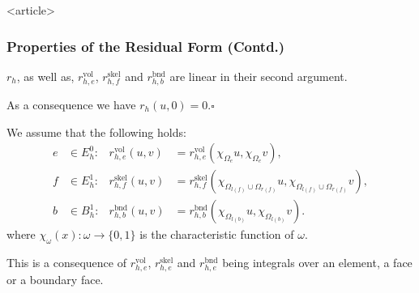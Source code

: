 \begin{frame}<article>
\frametitle<presentation>{Properties of the Residual Form (Contd.)}
\begin{Pro}[Linearity]\label{Ass:Linearity}
$r_h$, as well as, $r^\text{vol}_{h,e}$, $r^\text{skel}_{h,f}$ and
$r^\text{bnd}_{h,b}$ are linear in their second
argument.

As a consequence we have $r_h(u,0)=0$.\hfill$\square$
\end{Pro}
\begin{Pro}[Localization]
We assume that the following holds:
\begin{subequations}
\begin{align*}
e&\in E^0_h : & r^\text{vol}_{h,e}(u,v) &= r^\text{vol}_{h,e}(\chi_{\Omega_e} u,\chi_{\Omega_e} v),\\
f&\in E^1_h : & r^\text{skel}_{h,f}(u,v) &=
r^\text{skel}_{h,f}(\chi_{\Omega_{l(f)}\cup\Omega_{r(f)}}
u,\chi_{\Omega_{l(f)}\cup\Omega_{r(f)}} v),\\ 
b&\in B^1_h : & r^\text{bnd}_{h,b}(u,v) &= r^\text{bnd}_{h,b}(\chi_{\Omega_{l(b)}} u,\chi_{\Omega_{l(b)}} v).
\end{align*}
\end{subequations}
where $\chi_\omega(x) : \omega \to \{0,1\}$ is the characteristic function of $\omega$.

This is a consequence of  $r^\text{vol}_{h,e}$, $r^\text{skel}_{h,e}$
and $r^\text{bnd}_{h,e}$ being integrals over an element, a face or a
boundary face.
\end{Pro}
\end{frame}

\cleardoublepage
